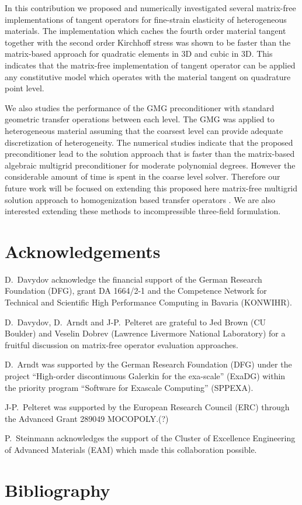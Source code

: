 \documentclass[preprint,12pt,times]{elsarticle}
\begin{document}
In this contribution we proposed and numerically investigated several matrix-free implementations of tangent operators for fine-strain elasticity of heterogeneous materials.
The implementation which caches the fourth order material tangent together with the second order Kirchhoff stress was shown to be faster than the matrix-based approach for quadratic elements in 3D and cubic in 3D.
This indicates that the matrix-free implementation of tangent operator can be applied any constitutive model which operates with the material tangent on quadrature point level.

We also studies the performance of the GMG preconditioner with standard geometric transfer operations between each level. The GMG was applied to heterogeneous material assuming that the coarsest level can provide adequate discretization of heterogeneity. The numerical studies indicate that the proposed preconditioner lead to the solution approach that is faster than the matrix-based algebraic multigrid preconditioner for moderate polynomial degrees. However the considerable amount of time is spent in the coarse level solver. Therefore our future work will be focused on extending this proposed here matrix-free multigrid solution approach to homogenization based transfer operators \cite{Miehe2007}. We are also interested  extending these methods to incompressible three-field formulation.

\section*{Acknowledgements}

D.~Davydov acknowledge the financial support of the German Research Foundation (DFG), grant DA 1664/2-1
and the Competence Network for Technical and Scientific High Performance Computing in Bavaria (KONWIHR).

D.~Davydov, D.~Arndt and J-P.~Pelteret are grateful to Jed Brown (CU Boulder) and Veselin Dobrev (Lawrence Livermore National Laboratory) for a fruitful discussion on matrix-free operator evaluation approaches.

D.~Arndt was supported by the German Research Foundation (DFG) under the project ``High-order discontinuous
Galerkin for the exa-scale'' (\mbox{ExaDG}) within the priority program ``Software
for Exascale Computing'' (SPPEXA).

{\color{red}
J-P.~Pelteret was supported by the European Research Council (ERC) through
the Advanced Grant 289049 MOCOPOLY.(?)
}

P.~Steinmann acknowledges the support of the Cluster of Excellence Engineering of Advanced Materials (EAM) which made this collaboration possible.

\section*{Bibliography}



\end{document}
